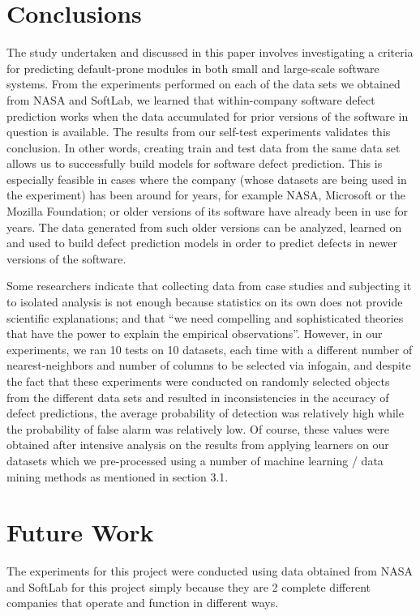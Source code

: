 \documentclass{sig-alternate}
\begin{document}
\newpage
\section{Conclusions}
The study undertaken and discussed in this paper involves investigating a criteria for predicting default-prone modules in both small and large-scale software systems. From the experiments performed on each of the data sets we obtained from NASA and SoftLab, we learned that within-company software defect prediction works when the data accumulated for prior versions of the software in question is available. The results from our self-test experiments validates this conclusion. In other words, creating train and test data from the same data set allows us to successfully build models for software defect prediction. This is especially feasible in cases where the company (whose datasets are being used in the experiment) has been around for years, for example NASA, Microsoft or the Mozilla Foundation; or older versions of its software have already been in use for years. The data generated from such older versions can be analyzed, learned on and used to build defect prediction models in order to predict defects in newer versions of the software.

Some researchers indicate that collecting data from case studies and subjecting it to isolated analysis is not enough because statistics on its own does not provide scientific explanations; and that ``we need compelling and sophisticated theories that have the power to explain the empirical observations''\cite{critique}. However, in our experiments, we ran 10 tests on 10 datasets, each time with a different number of nearest-neighbors and number of columns to be selected via infogain, and despite the fact that these experiments were conducted on randomly selected objects from the different data sets and resulted in inconsistencies in the accuracy of defect predictions, the average probability of detection was relatively high while the probability of false alarm was relatively low. Of course, these values were obtained after intensive analysis on the results from applying learners on our datasets which we pre-processed using a number of machine learning / data mining methods as mentioned in section 3.1.


\section{Future Work}
The experiments for this project were conducted using data obtained from NASA and SoftLab for this project simply because they are 2 complete different companies that operate and function in different ways. 
\end{document}
